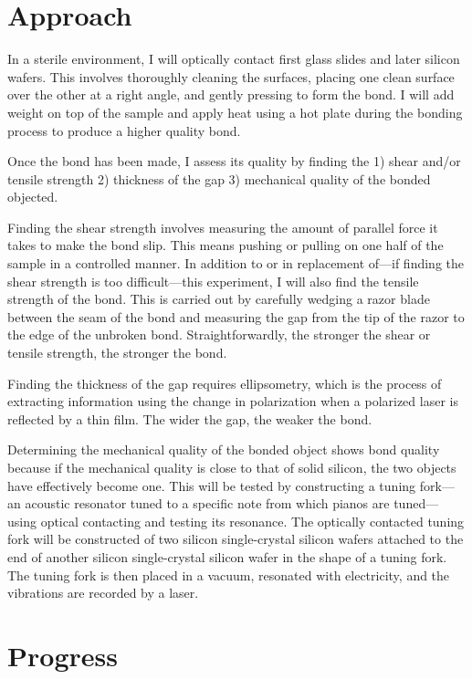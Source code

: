 \documentclass[colorlinks=true,pdfstartview=FitV,linkcolor=blue,
            citecolor=red,urlcolor=magenta]{ligodoc}
\begin{document}
\section{Approach} 

In a sterile environment, I will optically contact first glass slides and later silicon wafers. This involves thoroughly cleaning the surfaces, placing one clean surface over the other at a right angle, and gently pressing to form the bond. I will add weight on top of the sample and apply heat using a hot plate during the bonding process to produce a higher quality bond.

Once the bond has been made, I assess its quality by finding the 1) shear and/or tensile strength 2) thickness of the gap 3) mechanical quality of the bonded objected.

Finding the shear strength involves measuring the amount of parallel force it takes to make the bond slip. This means pushing or pulling on one half of the sample in a controlled manner. In addition to or in replacement of---if finding the shear strength is too difficult---this experiment, I will also find the tensile strength of the bond. This is carried out by carefully wedging a razor blade between the seam of the bond and measuring the gap from the tip of the razor to the edge of the unbroken bond. Straightforwardly, the stronger the shear or tensile strength, the stronger the bond.

Finding the thickness of the gap requires ellipsometry, which is the process of extracting information using the change in polarization when a polarized laser is reflected by a thin film. The wider the gap, the weaker the bond.

Determining the mechanical quality of the bonded object shows bond quality because if the mechanical quality is close to that of solid silicon, the two objects have effectively become one. This will be tested by constructing a tuning fork---an acoustic resonator tuned to a specific note from which pianos are tuned---using optical contacting and testing its resonance. The optically contacted tuning fork will be constructed of two silicon single-crystal silicon wafers attached to the end of another silicon single-crystal silicon wafer in the shape of a tuning fork. The tuning fork is then placed in a vacuum, resonated with electricity, and the vibrations are recorded by a laser.

\section{Progress}
\end{document}
